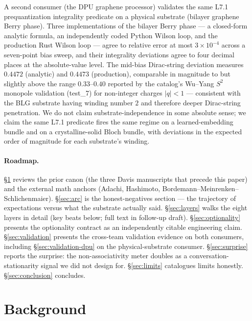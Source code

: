 \documentclass[11pt,letterpaper]{article}
\begin{document}
A second consumer (the DPU graphene processor) validates the same
L7.1 prequantization integrality predicate on a physical substrate
(bilayer graphene Berry phase). Three implementations of the bilayer
Berry phase --- a closed-form analytic formula, an independently
coded Python Wilson loop, and the production Rust Wilson loop ---
agree to relative error at most $3 \times 10^{-4}$ across a
seven-point bias sweep, and their integrality deviations agree to
four decimal places at the absolute-value level. The mid-bias
Dirac-string deviation measures $0.4472$ (analytic) and $0.4473$
(production), comparable in magnitude to but slightly above the
range $0.33$--$0.40$ reported by the catalog's Wu--Yang $S^2$
monopole validation (test\_7) for non-integer charges $|q| < 1$ ---
consistent with the BLG substrate having winding number $2$ and
therefore deeper Dirac-string penetration. We do not claim
substrate-independence in some absolute sense; we claim the same
L7.1 predicate fires the same regime on a learned-embedding bundle
and on a crystalline-solid Bloch bundle, with deviations in the
expected order of magnitude for each substrate's winding.

\paragraph{Roadmap.}
\S\ref{sec:background} reviews the prior canon (the three Davis
manuscripts that precede this paper) and the external math anchors
(Adachi, Hashimoto, Bordemann--Meinrenken--Schlichenmaier).
\S\ref{sec:arc} is the honest-negatives section --- the trajectory of
expectations versus what the substrate actually said.
\S\ref{sec:layers} walks the eight layers in detail (key beats below;
full text in follow-up draft). \S\ref{sec:optionality} presents the
optionality contract as an independently citable engineering claim.
\S\ref{sec:validation} presents the cross-team validation evidence on
both consumers, including \S\ref{sec:validation-dpu} on the
physical-substrate consumer. \S\ref{sec:surprise} reports the
surprise: the non-associativity meter doubles as a
conversation-stationarity signal we did not design for.
\S\ref{sec:limits} catalogues limits honestly.
\S\ref{sec:conclusion} concludes.


\section{Background}
\label{sec:background}
\end{document}
